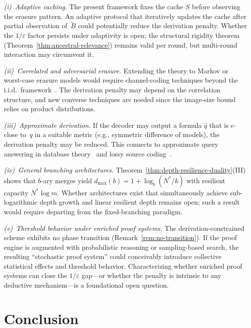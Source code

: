 \documentclass[journal]{IEEEtran}
\numberwithin{equation}{section}
\begin{document}
\emph{(i)~Adaptive caching.}
The present framework fixes the cache $S$ before observing the
erasure pattern.
An adaptive protocol that iteratively updates the cache after
partial observation of~$\tilde B$ could potentially reduce the
derivation penalty.
Whether the $1/\varepsilon$ factor persists under adaptivity
is open; the structural rigidity theorem
(Theorem~\ref{thm:ancestral-relevance}) remains valid per
round, but multi-round interaction may circumvent it.

\emph{(ii)~Correlated and adversarial erasure.}
Extending the theory to Markov or worst-case erasure models
would require channel-coding techniques beyond the i.i.d.\
framework~\cite{gallager1968information}.
The derivation penalty may depend on the correlation structure,
and new converse techniques are needed since the image-size
bound relies on product distributions.

\emph{(iii)~Approximate derivation.}
If the decoder may output a formula $\hat q$ that is
$\epsilon$-close to~$q$ in a suitable metric (e.g., symmetric
difference of models), the derivation penalty may be reduced.
This connects to approximate query answering in database
theory~\cite{abiteboul1995foundations} and lossy
source coding~\cite{cover2006elements}.

\emph{(iv)~General branching architectures.}
Theorem~\ref{thm:depth-resilience-duality}(III) shows that
$b$-ary merges yield
$d_{\max}(b)=1+\log_b(N^*/k)$ with resilient capacity
$N^*\log m$.
Whether architectures exist that simultaneously achieve
sub-logarithmic depth growth and linear resilient depth remains
open; such a result would require departing from the
fixed-branching paradigm.

\emph{(v)~Threshold behavior under enriched proof systems.}
The derivation-constrained scheme exhibits no phase transition
(Remark~\ref{rem:no-transition}).
If the proof engine is augmented with probabilistic reasoning
or sampling-based search, the resulting ``stochastic proof
system'' could conceivably introduce collective statistical
effects and threshold behavior.
Characterizing whether enriched proof systems can close the
$1/\varepsilon$ gap---or whether the penalty is intrinsic to
any deductive mechanism---is a foundational open question.

\section{Conclusion}
\label{sec:conclusion}
\end{document}
